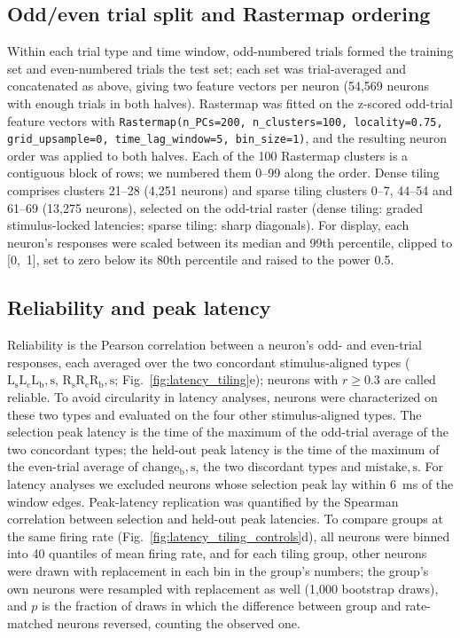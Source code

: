 \documentclass[10pt,lineno]{elife}
\begin{document}
\subsection{Odd/even trial split and Rastermap ordering}
Within each trial type and time window, odd-numbered trials formed the training set and even-numbered trials the test set; each set was trial-averaged and concatenated as above, giving two feature vectors per neuron (54,569 neurons with enough trials in both halves). Rastermap \cite{stringer2024rastermap} was fitted on the z-scored odd-trial feature vectors with \verb|Rastermap(n_PCs=200, n_clusters=100, locality=0.75,| \verb|grid_upsample=0, time_lag_window=5, bin_size=1)|, and the resulting neuron order was applied to both halves. Each of the 100 Rastermap clusters is a contiguous block of rows; we numbered them 0--99 along the order. Dense tiling comprises clusters 21--28 (4,251 neurons) and sparse tiling clusters 0--7, 44--54 and 61--69 (13,275 neurons), selected on the odd-trial raster (dense tiling: graded stimulus-locked latencies; sparse tiling: sharp diagonals). For display, each neuron's responses were scaled between its median and 99th percentile, clipped to [0,~1], set to zero below its 80th percentile and raised to the power 0.5.

\subsection{Reliability and peak latency}
Reliability is the Pearson correlation between a neuron's odd- and even-trial responses, each averaged over the two concordant stimulus-aligned types ($\mathrm{L_sL_cL_b,s}$, $\mathrm{R_sR_cR_b,s}$; Fig.~\ref{fig:latency_tiling}e); neurons with $r\geq0.3$ are called reliable. To avoid circularity in latency analyses, neurons were characterized on these two types and evaluated on the four other stimulus-aligned types. The selection peak latency is the time of the maximum of the odd-trial average of the two concordant types; the held-out peak latency is the time of the maximum of the even-trial average of $\mathrm{change_b,s}$, the two discordant types and $\mathrm{mistake,s}$. For latency analyses we excluded neurons whose selection peak lay within 6~ms of the window edges. Peak-latency replication was quantified by the Spearman correlation between selection and held-out peak latencies. To compare groups at the same firing rate (Fig.~\ref{fig:latency_tiling_controls}d), all neurons were binned into 40 quantiles of mean firing rate, and for each tiling group, other neurons were drawn with replacement in each bin in the group's numbers; the group's own neurons were resampled with replacement as well (1,000 bootstrap draws), and $p$ is the fraction of draws in which the difference between group and rate-matched neurons reversed, counting the observed one.
\end{document}
